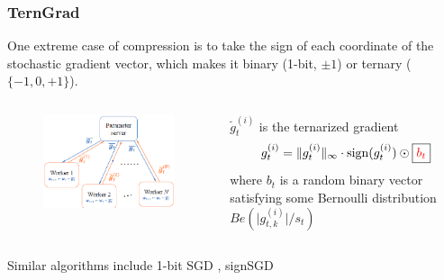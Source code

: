 
\begin{frame}
\frametitle{TernGrad}

One extreme case of compression is to take the {\color{red}sign} of each coordinate of the stochastic gradient vector, which makes it binary (1-bit, $\pm 1$) or ternary ($\{-1, 0, +1\}$).

\vspace{0.4em}

\begin{columns}
\begin{column}{0.44\textwidth}
\begin{figure}
    \centering
    \includegraphics[width=1\textwidth,keepaspectratio]{images/terngrad.png}
\end{figure}
\end{column}
\begin{column}{0.52\textwidth}
$\widetilde{g}_t^{(i)}$ is the {\color{red}ternarized} gradient
$$g_t^{(i)} = \lVert g_t^{(i)} \rVert_{\infty} \cdot \operatorname{sign}(g_t^{(i)}) \odot \framebox{\color{red} $b_t$}$$
where $b_t$ is a random binary vector satisfying some Bernoulli distribution $Be(\lvert g_{t,k}^{(i)} \rvert / s_t)$
\end{column}
\end{columns}

\vspace{0.4em}

Similar algorithms include 1-bit SGD \cite{seide2014_1bitsgd}, signSGD \cite{bernstein2018signsgd}


\end{frame}

